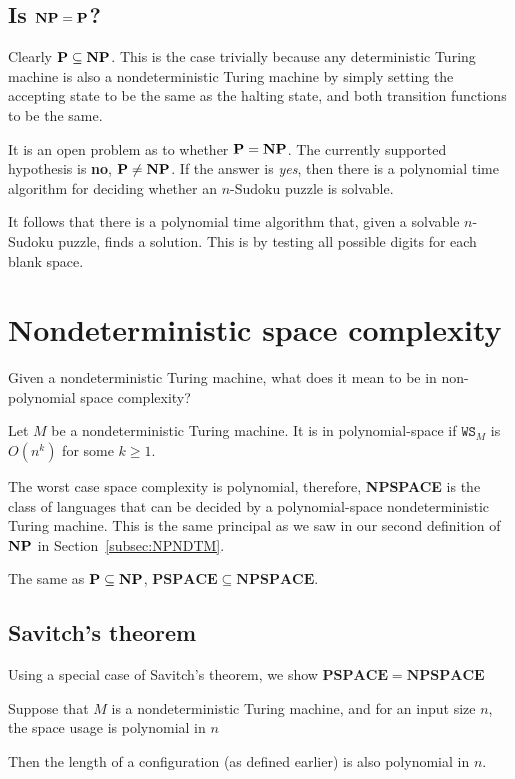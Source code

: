 \documentclass{article}
\begin{document}
\subsection{Is $\bf{NP} = P$?}

Clearly $\bf{P} \subseteq \bf{NP}$. This is the case trivially because any deterministic Turing machine is also a nondeterministic Turing machine by simply setting the accepting state to be the same as the halting state, and both transition functions to be the same.

It is an open problem as to whether $\bf{P} = \bf{NP}$. The currently supported hypothesis is \textbf{no}, $\bf{P} \neq \bf{NP}$. If the answer is \textit{yes}, then there is a polynomial time algorithm for deciding whether an $n$-Sudoku puzzle is solvable.

It follows that there is a polynomial time algorithm that, given a solvable $n$-Sudoku puzzle, finds a solution. This is by testing all possible digits for each blank space.


\section{Nondeterministic space complexity}

Given a nondeterministic Turing machine, what does it mean to be in non-polynomial space complexity?

Let $M$ be a nondeterministic Turing machine. It is in polynomial-space if $\texttt{WS}_{M}$ is $O(n^{k})$ for some $k \geq 1$.

The worst case space complexity is polynomial, therefore, \textbf{NPSPACE} is the class of languages that can be decided by a polynomial-space nondeterministic Turing machine. This is the same principal as we saw in our second definition of $\bf{NP}$ in Section~\ref{subsec:NPNDTM}.

The same as $\bf{P} \subseteq \bf{NP}$, $\mathbf{PSPACE} \subseteq \mathbf{NPSPACE}  $.

\subsection{Savitch's theorem}

Using a special case of Savitch's theorem, we show $\mathbf{PSPACE} = \mathbf{NPSPACE}  $

Suppose that $M$ is a nondeterministic Turing machine, and for an input size $n$, the space usage is polynomial in $n$

Then the length of a configuration (as defined earlier) is also polynomial in $n$.
\end{document}
